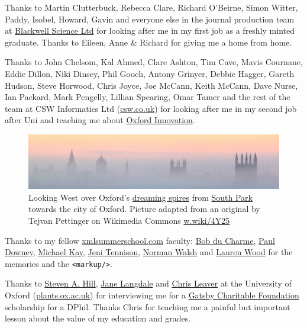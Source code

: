 \documentclass[
]{book}
\begin{document}
Thanks to Martin Clutterbuck, Rebecca Clare, Richard O'Beirne, Simon Witter, Paddy, Isobel, Howard, Gavin and everyone else in the journal production team at \href{https://www.flickr.com/photos/dullhunk/4042838703}{Blackwell Science Ltd} for looking after me in my first job as a freshly minted graduate. Thanks to Eileen, Anne \& Richard for giving me a home from home.

Thanks to John Chelsom, Kal Ahmed, Clare Ashton, Tim Cave, Mavis Cournane, Eddie Dillon, Niki Dinsey, Phil Gooch, Antony Grinyer, Debbie Hagger, Gareth Hudson, Steve Horwood, Chris Joyce, Joe McCann, Keith McCann, Dave Nurse, Ian Packard, Mark Pengelly, Lillian Spearing, Omar Tamer and the rest of the team at CSW Informatics Ltd (\href{https://csw.co.uk/}{csw.co.uk}) for looking after me in my second job after Uni and teaching me about \href{https://oxin-centres.co.uk/}{Oxford Innovation}.

\begin{figure}

{\centering \includegraphics[width=1\linewidth]{images/dreaming-spires-oxford-sunrise} 

}

\caption{Looking West over Oxford's \href{https://en.wikipedia.org/wiki/Thyrsis_(poem)}{dreaming spires} from \href{https://en.wikipedia.org/wiki/South_Park,_Oxford}{South Park} towards the city of Oxford. Picture adapted from an original by Tejvan Pettinger on Wikimedia Commons \href{https://w.wiki/4Y25}{w.wiki/4Y25}}\label{fig:oxford-fig}
\end{figure}

Thanks to my fellow \href{https://xmlsummerschool.com/}{xmlsummerschool.com} faculty: \href{https://www.bobdc.com/blog/}{Bob du Charme}, \href{https://twitter.com/psd}{Paul Downey}, \href{https://en.wikipedia.org/wiki/Michael_Howard_Kay}{Michael Kay}, \href{https://en.wikipedia.org/wiki/Jeni_Tennison}{Jeni Tennison}, \href{https://norman.walsh.name/}{Norman Walsh} and \href{https://www.laurenwood.org/}{Lauren Wood} for the memories and the \texttt{\textless{}markup/\textgreater{}}.



Thanks to \href{https://en.wikipedia.org/wiki/Steven_A._Hill}{Steven A. Hill}, \href{https://en.wikipedia.org/wiki/Jane_A._Langdale}{Jane Langdale} and \href{https://en.wikipedia.org/wiki/Chris_J._Leaver}{Chris Leaver} at the University of Oxford (\href{https://www.plants.ox.ac.uk/}{plants.ox.ac.uk}) for interviewing me for a \href{https://www.gatsby.org.uk/about-gatsby}{Gatsby Charitable Foundation} scholarship for a DPhil. Thanks Chris for teaching me a painful but important lesson about the value of my education and grades.
\end{document}
